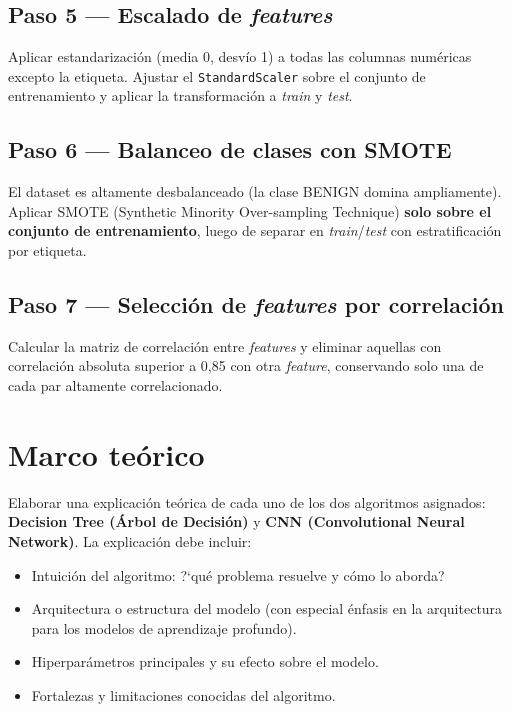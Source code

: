 \documentclass[11pt,a4paper]{article}
\newcommand{\codigo}[1]{\texttt{#1}}
\begin{document}
\subsection*{Paso 5 --- Escalado de \textit{features}}
Aplicar estandarizaci\'on (media 0, desv\'io 1) a todas las columnas num\'ericas excepto la etiqueta. Ajustar el \codigo{StandardScaler} sobre el conjunto de entrenamiento y aplicar la transformaci\'on a \textit{train} y \textit{test}.

\subsection*{Paso 6 --- Balanceo de clases con SMOTE}
El dataset es altamente desbalanceado (la clase BENIGN domina ampliamente). Aplicar SMOTE (Synthetic Minority Over-sampling Technique) \textbf{solo sobre el conjunto de entrenamiento}, luego de separar en \textit{train}/\textit{test} con estratificaci\'on por etiqueta.

\subsection*{Paso 7 --- Selecci\'on de \textit{features} por correlaci\'on}
Calcular la matriz de correlaci\'on entre \textit{features} y eliminar aquellas con correlaci\'on absoluta superior a 0,85 con otra \textit{feature}, conservando solo una de cada par altamente correlacionado.

\section{Marco te\'orico}
Elaborar una explicaci\'on te\'orica de cada uno de los dos algoritmos asignados: \textbf{Decision Tree (Árbol de Decisión)} y \textbf{CNN (Convolutional Neural Network)}. La explicaci\'on debe incluir:
\begin{itemize}[leftmargin=2em,itemsep=2pt]
    \item Intuici\'on del algoritmo: ?`qu\'e problema resuelve y c\'omo lo aborda?
    \item Arquitectura o estructura del modelo (con especial \'enfasis en la arquitectura para los modelos de aprendizaje profundo).
    \item Hiperpar\'ametros principales y su efecto sobre el modelo.
    \item Fortalezas y limitaciones conocidas del algoritmo.
\end{itemize}
\end{document}

